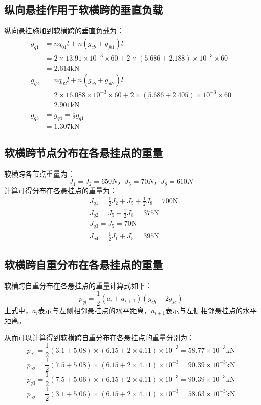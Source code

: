\subsection{纵向悬挂作用于软横跨的垂直负载}
纵向悬挂施加到软横跨的垂直负载为：
\begin{align*}
	g_{q1}&=nq_{01}l+n(g_{cb}+g_{jb1})l
	\\
	&=2\times 13.91\times 10^{-3}\times 60+2\times (5.686+2.188)\times 10^{-3}\times 60
	\\
	&=2.614\mathrm{ kN}
	\\
	g_{q2}&=nq_{02}l+n(g_{cb}+g_{jb2})l
	\\
	&=2\times 16.088\times 10^{-3}\times 60+2\times (5.686+2.405)\times 10^{-3}\times 60
	\\
	&=2.901\mathrm{ kN}
	\\
	g_{q3}&=g_{q4}=\frac{1}{2}g_{q1}
	\\
	&=1.307\mathrm{ kN}
\end{align*}

\subsection{软横跨节点分布在各悬挂点的重量}
软横跨各节点重量为：
\[ J_1=J_2=650N，J_5=70N，J_8=610N \]
计算可得分布在各悬挂点的重量为：
\begin{align*}
	&J_{q1}=\frac{1}{2}J_2+J_5+\frac{1}{2}J_8=700\mathrm{ N}
	\\
	&J_{q2}=J_5+\frac{1}{2}J_8=375\mathrm{ N}
	\\
	&J_{q3}=J_5=70\mathrm{ N}
	\\
	&J_{q4}=\frac{1}{2}J_1+J_5=395\mathrm{ N}
\end{align*}
\subsection{软横跨自重分布在各悬挂点的重量}
软横跨自重分布在各悬挂点的重量计算式如下：
$$
p_{qi}=\frac{1}{2}(a_i+a_{i+1})(g_{ch}+2g_{sc})
$$
上式中，$a_i$表示与左侧相邻悬挂点的水平距离，$a_{i+1}$表示与左侧相邻悬挂点的水平距离。

从而可以计算得到软横跨自重分布在各悬挂点的重量分别为：
$$
p_{q1}=\frac{1}{2}(3.1+5.08)\times (6.15+2\times 4.11)\times 10^{-3}=58.77\times 10^{-3}\mathrm{ kN}
$$
$$
p_{q2}=\frac{1}{2}(7.5+5.08)\times (6.15+2\times 4.11)\times 10^{-3}=90.39\times 10^{-3}\mathrm{ kN}
$$
$$
p_{q3}=\frac{1}{2}(7.5+5.06)\times (6.15+2\times 4.11)\times 10^{-3}=90.39\times 10^{-3}\mathrm{ kN}
$$
$$
p_{q2}=\frac{1}{2}(3.1+5.06)\times (6.15+2\times 4.11)\times 10^{-3}=58.63\times 10^{-3}\mathrm{ kN}
$$

